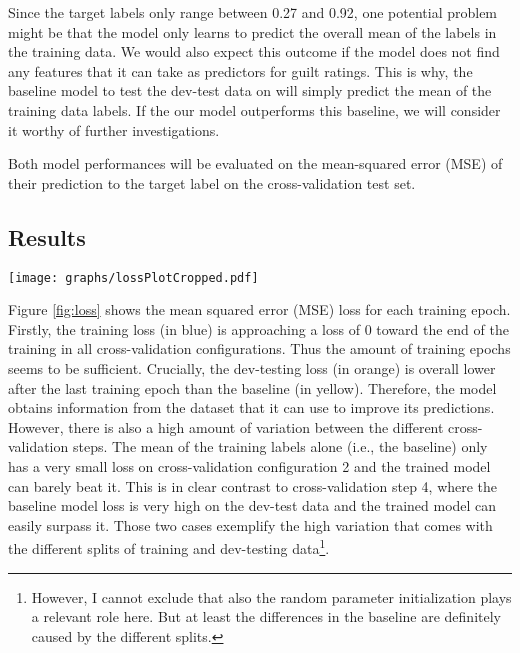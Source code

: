 \documentclass[11pt,a4paper]{article}
\begin{document}
Since the target labels only range between 0.27 and 0.92, one potential problem might be that the model only learns to predict the overall mean of the labels in the training data. We would also expect this outcome if the model does not find any features that it can take as predictors for guilt ratings. This is why, the baseline model to test the dev-test data on will simply predict the mean of the training data labels. If the our model outperforms this baseline, we will consider it worthy of further investigations.

Both model performances will be evaluated on the mean-squared error (MSE) of their prediction to the target label on the cross-validation test set.

\subsection{Results}

\begin{figure*}
	\texttt{[image: graphs/lossPlotCropped.pdf]}
	\caption{Loss (mean squared error) over epochs (x axis), faceted over cross-validation configurations. The performance of the model on the training set (in blue) approaches zero. The performance of the model on the dev-test set (in orange) generally outperforms the baseline (in yellow).}
	\label{fig:loss}
\end{figure*}

Figure \ref{fig:loss} shows the mean squared error (MSE) loss for each training epoch. Firstly, the training loss (in blue) is approaching a loss of 0 toward the end of the training in all cross-validation configurations. Thus the amount of training epochs seems to be sufficient. Crucially, the dev-testing loss (in orange) is overall lower after the last training epoch than the baseline (in yellow). Therefore, the model obtains information from the dataset that it can use to improve its predictions. However, there is also a high amount of variation between the different cross-validation steps. The mean of the training labels alone (i.e., the baseline) only has a very small loss on cross-validation configuration 2 and the trained model can barely beat it. This is in clear contrast to cross-validation step 4, where the baseline model loss is very high on the dev-test data and the trained model can easily surpass it. Those two cases exemplify the high variation that comes with the different splits of training and dev-testing data\footnote{However, I cannot exclude that also the random parameter initialization plays a relevant role here. But at least the differences in the baseline are definitely caused by the different splits.}.
\end{document}
